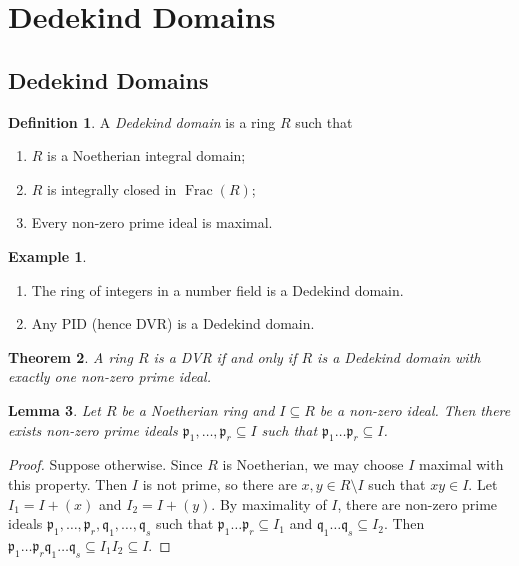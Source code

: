 \documentclass[11pt]{article}
\theoremstyle{definition}
\newtheorem{definition}{Definition}[subsection]
\newtheorem*{example}{Example}
\theoremstyle{plain}
\newtheorem{theorem}[definition]{Theorem}
\newtheorem{lemma}[definition]{Lemma}
\theoremstyle{remark}
\DeclareMathOperator{\Frac}{Frac}
\newcommand{\fp}{\mathfrak{p}}
\newcommand{\fq}{\mathfrak{q}}
\begin{document}
\section{Dedekind Domains}

\subsection{Dedekind Domains}

\begin{definition}\label{def:9_1}
    A \emph{Dedekind domain} is a ring $R$ such that
    \begin{enumerate}
        \item $R$ is a Noetherian integral domain;
        \item $R$ is integrally closed in $\Frac(R)$;
        \item Every non-zero prime ideal is maximal.
    \end{enumerate}
\end{definition}

\begin{example}\phantom{}
    \begin{enumerate}
        \item The ring of integers in a number field is a Dedekind domain.
        \item Any PID (hence DVR) is a Dedekind domain.
    \end{enumerate}
\end{example}

\begin{theorem}\label{thm:9_2}
    A ring $R$ is a DVR if and only if $R$ is a Dedekind domain with exactly one non-zero prime ideal.
\end{theorem}

\begin{lemma}\label{lem:9_3}
    Let $R$ be a Noetherian ring and $I \subseteq R$ be a non-zero ideal. Then there exists non-zero prime ideals $\fp_1, \ldots, \fp_r \subseteq I$ such that $\fp_1 \ldots \fp_r \subseteq I$.
\end{lemma}
\begin{proof}
    Suppose otherwise. Since $R$ is Noetherian, we may choose $I$ maximal with this property. Then $I$ is not prime, so there are $x, y \in R \setminus I$ such that $xy \in I$. Let $I_1 = I + (x)$ and $I_2 = I + (y)$. By maximality of $I$, there are non-zero prime ideals $\fp_1, \ldots, \fp_r, \fq_1, \ldots, \fq_s$ such that $\fp_1 \ldots \fp_r \subseteq I_1$ and $\fq_1 \ldots \fq_s \subseteq I_2$. Then $\fp_1 \ldots \fp_r \fq_1 \ldots \fq_s \subseteq I_1 I_2 \subseteq I$.
\end{proof}
\end{document}
